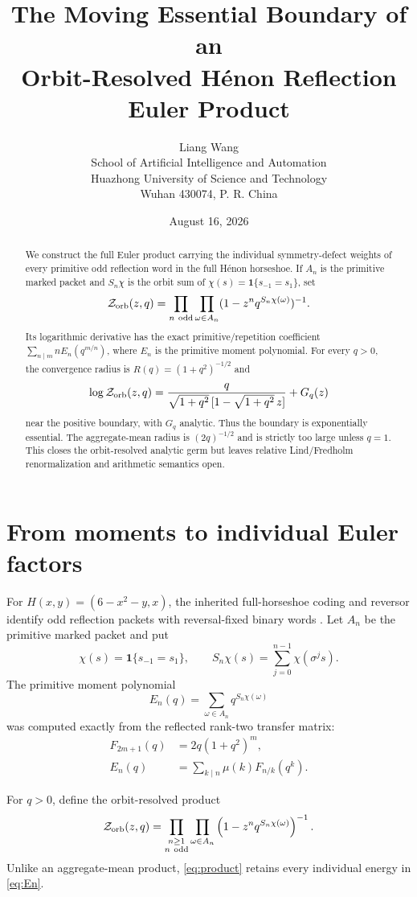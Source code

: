 \documentclass[11pt]{article}
\title{The Moving Essential Boundary of an\\Orbit-Resolved H\'enon Reflection Euler Product}
\author{Liang Wang\\\small School of Artificial Intelligence and Automation\\\small Huazhong University of Science and Technology\\\small Wuhan 430074, P. R. China}
\date{August 16, 2026}
\newcommand{\Zorb}{\mathcal Z_{\rm orb}}
\begin{document}
\maketitle

\begin{abstract}
We construct the full Euler product carrying the individual symmetry-defect
weights of every primitive odd reflection word in the full H\'enon horseshoe.
If $A_n$ is the primitive marked packet and
$S_n\chi$ is the orbit sum of $\chi(s)=\mathbf1\{s_{-1}=s_1\}$, set
\[
 \mathcal Z_{\rm orb}(z,q)=
 \prod_{n\ {\rm odd}}\prod_{\omega\in A_n}
 (1-z^nq^{S_n\chi(\omega)})^{-1}.
\]
Its logarithmic derivative has the exact primitive/repetition coefficient
$\sum_{n\mid m}nE_n(q^{m/n})$, where $E_n$ is the primitive moment
polynomial.  For every $q>0$, the convergence radius is
$R(q)=(1+q^2)^{-1/2}$ and
\[
 \log\mathcal Z_{\rm orb}(z,q)
 =\frac{q}{\sqrt{1+q^2}\,[1-\sqrt{1+q^2}\,z]}+G_q(z)
\]
near the positive boundary, with $G_q$ analytic.  Thus the boundary is
exponentially essential.  The aggregate-mean radius is $(2q)^{-1/2}$ and is
strictly too large unless $q=1$.  This closes the orbit-resolved analytic
germ but leaves relative Lind/Fredholm renormalization and arithmetic
semantics open.
\end{abstract}

\section{From moments to individual Euler factors}

For $H(x,y)=(6-x^2-y,x)$, the inherited full-horseshoe coding and reversor
identify odd reflection packets with reversal-fixed binary words
\cite{DevaneyNitecki1979,Arai2007}.  Let $A_n$ be the primitive marked
packet and put
\[
 \chi(s)=\mathbf1\{s_{-1}=s_1\},\qquad
 S_n\chi(s)=\sum_{j=0}^{n-1}\chi(\sigma^js).
\]
The primitive moment polynomial
\begin{equation}\label{eq:En}
 E_n(q)=\sum_{\omega\in A_n}q^{S_n\chi(\omega)}
\end{equation}
was computed exactly from the reflected rank-two transfer matrix:
\begin{align}
 F_{2m+1}(q)&=2q(1+q^2)^m,\label{eq:Fn}\\
 E_n(q)&=\sum_{k\mid n}\mu(k)F_{n/k}(q^k).\label{eq:primitive}
\end{align}

For $q>0$, define the orbit-resolved product
\begin{equation}\label{eq:product}
 \Zorb(z,q)=\prod_{\substack{n\ge1\\n\ {\rm odd}}}
 \prod_{\omega\in A_n}
 \left(1-z^nq^{S_n\chi(\omega)}\right)^{-1}.
\end{equation}
Unlike an aggregate-mean product, \eqref{eq:product} retains every individual
energy in \eqref{eq:En}.
\end{document}
